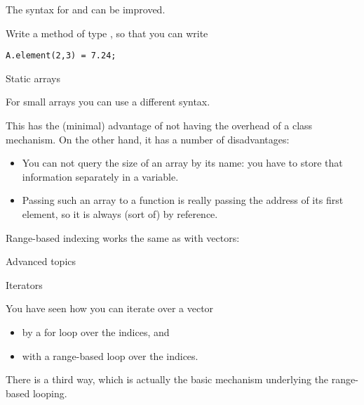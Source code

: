 The syntax for  and  can be improved.
\begin{exercise}
  Write a method  of type , so that you can write
\begin{verbatim}
A.element(2,3) = 7.24;
\end{verbatim}
\end{exercise}

 {Static arrays}
\label{sec:staticarray}

For small arrays you can use a different syntax. 


This has the
(minimal) advantage of not having the overhead of a class
mechanism. On the other hand, it has a number of disadvantages:
\begin{itemize}
\item You can not query the size of an array by its name: you have to
  store that information separately in a variable.
\item Passing such an array to a function is really passing the
  address of its first element, so it is always (sort of) by
  reference.
\end{itemize}

Range-based indexing works the same as with vectors:
%

 {Advanced topics}

 {Iterators}
\label{sec:iterator}

You have seen how you can iterate over a vector
\begin{itemize}
\item by a for loop over the indices, and
\item with a range-based loop over the indices.
\end{itemize}
There is a third way, which is actually the basic mechanism underlying
the range-based looping.

